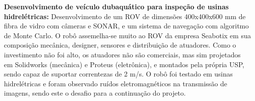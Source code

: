 \textbf{Desenvolvimento de veículo dubaquático para inspeção de usinas
hidrelétricas:}
Desenvolvimento de um ROV de dimensões 400x400x600 mm de fibra de vidro com
câmeras e SONAR, e um sistema de navegação com algoritmo de Monte
Carlo. O robô assemelha-se muito ao ROV da empresa Seabotix em sua composição
mecânica, designer, sensores e distribuição de atuadores. Como o investimento
não foi alto, os atuadores não são comerciais, mas sim projetados em Solidworks
(mecânica) e Proteus (eletrônica), e montados pela própria USP, sendo capaz de
suportar correntezas de 2 m/s. O robô foi testado em usinas
hidrelétricas e foram observado ruídos eletromagnéticos na transmissão de
imagens, sendo este o desafio para a continuação do projeto.
